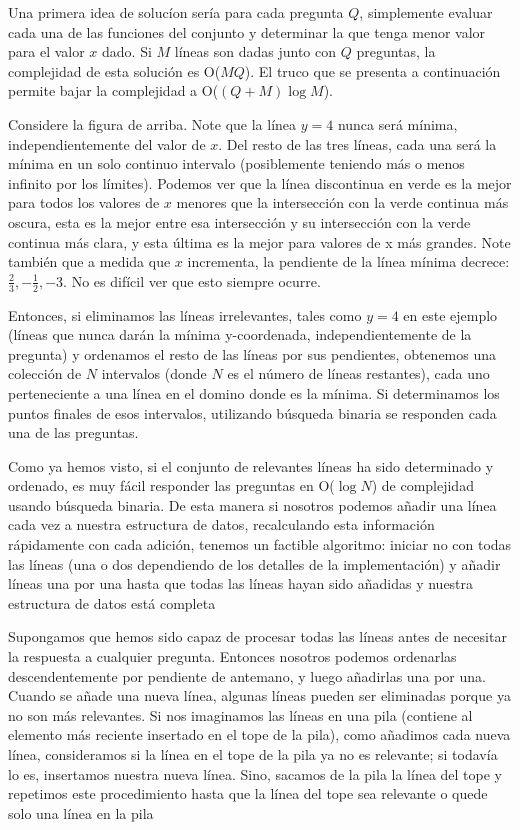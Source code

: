 Una primera idea de solucíon sería para cada pregunta $Q$, simplemente evaluar cada una de las
funciones del conjunto y determinar la que tenga menor valor para el valor $x$ dado. Si $M$ líneas son
dadas junto con $Q$ preguntas, la complejidad de esta solución es O($MQ$). El truco que se presenta a
continuación permite bajar la complejidad a O($(Q+M)\log M$).

Considere la figura  de arriba. Note que la línea $y = 4$ nunca será mínima, independientemente del valor 
de $x$. Del resto de las tres líneas, cada una será la mínima en un solo continuo intervalo (posiblemente 
teniendo más o menos infinito por los límites). Podemos ver que la línea discontinua en verde es la mejor 
para todos los valores de $x$ menores que la intersección con la verde continua más oscura, esta es la mejor
entre esa intersección y su intersección con la verde continua más clara, y esta última es la mejor para
valores de x más grandes. Note también que a medida que $x$ incrementa, la pendiente de la línea mínima
decrece:$\frac{2}{3},-\frac{1}{2},-3$. No es difícil ver que esto siempre ocurre.

Entonces, si eliminamos las líneas irrelevantes, tales como $y = 4$ en este ejemplo (líneas que nunca
darán la mínima y-coordenada, independientemente de la pregunta) y ordenamos el resto de las líneas
por sus pendientes, obtenemos una colección de $N$ intervalos (donde $N$ es el número de líneas restantes),
cada uno perteneciente a una línea en el domino donde es la mínima. Si determinamos los puntos finales
de esos intervalos, utilizando búsqueda binaria se responden cada una de las preguntas.

Como ya hemos visto, si el conjunto de relevantes líneas ha sido determinado y ordenado, es muy
fácil responder las preguntas en O($\log N$) de complejidad usando búsqueda binaria. De esta manera si
nosotros podemos añadir una línea cada vez a nuestra estructura de datos, recalculando esta información
rápidamente con cada adición, tenemos un factible algoritmo: iniciar no con todas las líneas (una o dos
dependiendo de los detalles de la implementación) y añadir líneas una por una hasta que todas las líneas
hayan sido añadidas y nuestra estructura de datos está completa

Supongamos que hemos sido capaz de procesar todas las líneas antes de necesitar la respuesta a
cualquier pregunta. Entonces nosotros podemos ordenarlas descendentemente por pendiente de antemano,
y luego añadirlas una por una. Cuando se añade una nueva línea, algunas líneas pueden ser eliminadas
porque ya no son más relevantes. Si nos imaginamos las líneas en una pila (contiene al elemento más
reciente insertado en el tope de la pila), como añadimos cada nueva línea, consideramos si la línea en el
tope de la pila ya no es relevante; si todavía lo es, insertamos nuestra nueva línea. Sino, sacamos de la
pila la línea del tope y repetimos este procedimiento hasta que la línea del tope sea relevante o quede
solo una línea en la pila


